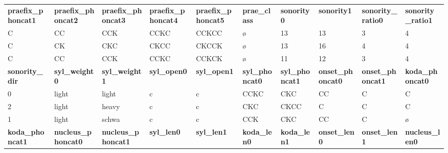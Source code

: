 \begin{table}[p]
\begin{tabular}{|p{2cm}|p{2cm}|p{2cm}|p{2cm}|p{2cm}|p{1.5cm}|p{1.5cm}|p{1.5cm}|p{1.8cm}|p{1.8cm}|}
\hline
{\bf praefix\_phoncat1} & {\bf praefix\_phoncat2} & {\bf praefix\_phoncat3} & {\bf praefix\_phoncat4} & {\bf praefix\_phoncat5} & {\bf prae\_class}   & {\bf sonority0}     & {\bf sonority1}        & {\bf sonority\_ratio0} & {\bf sonority\_ratio1} \\
C                       & CC                      & CCK                     & CCKC                    & CCKCC                   & ø                   & 13                  & 13                     & 3                      & 4                      \\
C                       & CK                      & CKC                     & CKCC                    & CKCCK                   & ø                   & 13                  & 16                     & 4                      & 4                      \\
C                       & CC                      & CCK                     & CCKC                    & CCKCK                   & ø                   & 11                  & 12                     & 3                      & 4                      \\\hline
\hline
{\bf sonority\_dir}     & {\bf syl\_weight0}      & {\bf syl\_weight1}      & {\bf syl\_open0}        & {\bf syl\_open1}        & {\bf syl\_phoncat0} & {\bf syl\_phoncat1} & {\bf onset\_phoncat0}  & {\bf onset\_phoncat1}  & {\bf koda\_phoncat0}   \\
0                       & light                   & light                   & c                       & c                       & CCKC                & CKC                 & CC                     & C                      & C                      \\
2                       & light                   & heavy                   & c                       & c                       & CKC                 & CKCC                & C                      & C                      & C                      \\
1                       & light                   & schwa                   & c                       & c                       & CCK                 & CKC                 & CC                     & C                      & ø                      \\\hline
\hline
{\bf koda\_phoncat1}    & {\bf nucleus\_phoncat0} & {\bf nucleus\_phoncat1} & {\bf syl\_len0}         & {\bf syl\_len1}         & {\bf koda\_len0}    & {\bf koda\_len1}    & {\bf onset\_len0}      & {\bf onset\_len1}      & {\bf nucleus\_len0}    \\

\end{tabular}
\end{table}
